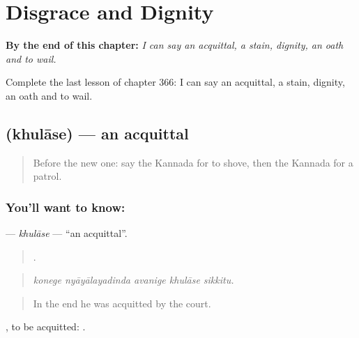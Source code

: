 
\chapter{Disgrace and Dignity}
\label{ch:ka-disgrace-and-dignity}

\begin{chapteropening}
\textbf{By the end of this chapter:} \emph{I can say an acquittal, a stain, dignity, an oath and to wail.}

Complete the last lesson of chapter 366: I can say an acquittal, a stain, dignity, an oath and to wail.
\end{chapteropening}

\section[\texorpdfstring{\kn{ಖುಲಾಸೆ} (khulāse)}{ಖುಲಾಸೆ (khulāse)}]{ (khulāse) — an acquittal}

\label{lesson:KA-C366-khulase}



\begin{quote}
Before the new one: say the Kannada for to shove, then the Kannada for a patrol.
\end{quote}

\subsection*{You'll want to know: }
\textbf{} — \emph{khulāse} — \textquotedblleft{}an acquittal\textquotedblright{}.

\begin{quote}
    .
\end{quote}

\begin{quote}
\emph{konege nyāyālayadinda avanige khulāse sikkitu.}
\end{quote}

\begin{quote}
In the end he was acquitted by the court.
\end{quote}

 , to be acquitted:   .

